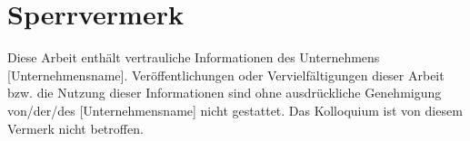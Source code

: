 \chapter*{Sperrvermerk}

Diese Arbeit enthält vertrauliche Informationen des Unternehmens [Unternehmensname]. Veröffentlichungen oder Vervielfältigungen dieser Arbeit bzw. die Nutzung dieser Informationen sind ohne ausdrückliche Genehmigung von/der/des [Unternehmensname] nicht gestattet. Das Kolloquium ist von diesem Vermerk nicht betroffen.

\vfill